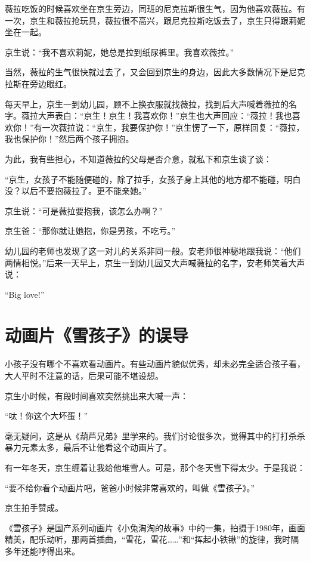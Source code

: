 \documentclass[twoside,openright,headings=optiontohead]{ctexbook} %
\begin{document}
{薇拉吃饭的时候喜欢坐在京生旁边，同班的尼克拉斯很生气，因为他喜欢薇拉。有一次，京生和薇拉抢玩具，薇拉很不高兴，跟尼克拉斯吃饭去了，京生只得跟莉妮坐在一起。

京生说：``我不喜欢莉妮，她总是拉到纸尿裤里。我喜欢薇拉。''

当然，薇拉的生气很快就过去了，又会回到京生的身边，因此大多数情况下是尼克拉斯在旁边眼红。

每天早上，京生一到幼儿园，顾不上换衣服就找薇拉，找到后大声喊着薇拉的名字。薇拉大声表白：``京生！京生！我喜欢你！''京生也大声回应：``薇拉！我也喜欢你！''有一次薇拉说：``京生，我要保护你！''京生愣了一下，原样回复：``薇拉，我也保护你！''然后两个孩子拥抱。

为此，我有些担心，不知道薇拉的父母是否介意，就私下和京生谈了谈：

``京生，女孩子不能随便碰的，除了拉手，女孩子身上其他的地方都不能碰，明白没？以后不要抱薇拉了。更不能亲她。''

京生说：``可是薇拉要抱我，该怎么办啊？''

京生爸：``那你就让她抱，你是男孩，不吃亏。''

幼儿园的老师也发现了这一对儿的关系非同一般。安老师很神秘地跟我说：``他们两情相悦。''后来一天早上，京生一到幼儿园又大声喊薇拉的名字，安老师笑着大声说：

``Big love!''

\chapter*{动画片《雪孩子》的误导}\label{snow-kid}

小孩子没有哪个不喜欢看动画片。有些动画片貌似优秀，却未必完全适合孩子看，大人平时不注意的话，后果可能不堪设想。

京生小时候，有段时间喜欢突然挑出来大喊一声：

``呔！你这个大坏蛋！''

毫无疑问，这是从《葫芦兄弟》里学来的。我们讨论很多次，觉得其中的打打杀杀暴力元素太多，最后不让他看这个动画片了。

有一年冬天，京生缠着让我给他堆雪人。可是，那个冬天雪下得太少。于是我说：

``要不给你看个动画片吧，爸爸小时候非常喜欢的，叫做《雪孩子》。''

京生拍手赞成。

《雪孩子》是国产系列动画片《小兔淘淘的故事》中的一集，拍摄于1980年，画面精美，配乐动听，那两首插曲，``雪花，雪花\ldots{}\ldots{}''和``挥起小铁锹''的旋律，我时隔多年还能哼得出来。

}
\end{document}

